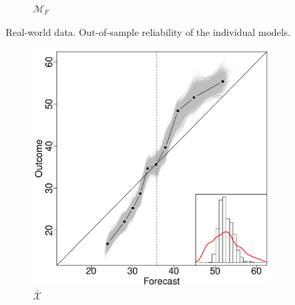 \documentclass[11pt]{article}
\theoremstyle{definition}
\theoremstyle{definition}
\begin{document}
\begin{figure}
\begin{subfigure}[b]{0.24\textwidth}
                \caption{$\mathcal{M}_F$}
                \label{RelDiagramNoF}
        \end{subfigure}           
          \caption{Real-world data. Out-of-sample reliability of the individual models.}
                \label{RelDiagramMo}
\end{figure}



\begin{figure}
        \centering
 
        \begin{subfigure}[b]{0.323\textwidth}
                \includegraphics[width=\textwidth]{IndependentELP}
                \caption{$\bar{\mathcal{X}}$}
                \label{fig:mouse}
        \end{subfigure}
                  \begin{subfigure}[b]{0.323\textwidth}

\end{subfigure}
\end{figure}
\end{document}
